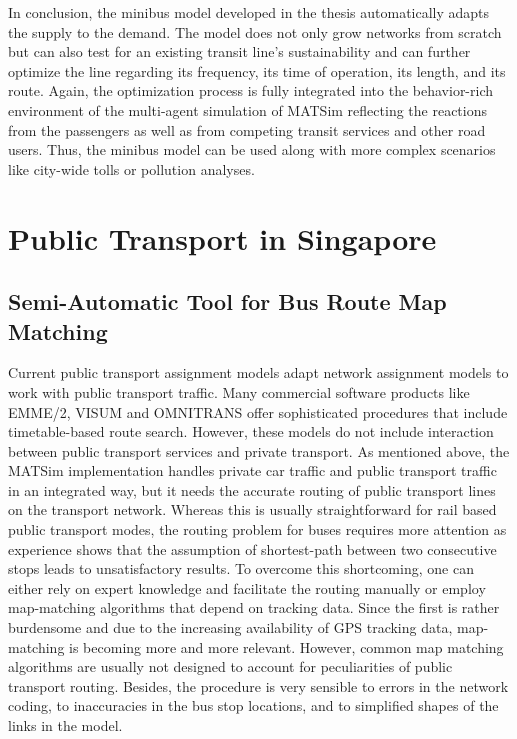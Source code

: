 In conclusion, the minibus model developed in the thesis automatically adapts the supply to the demand. The model does not only grow networks from scratch but can also test for an existing transit line's sustainability and can further optimize the line regarding its frequency, its time of operation, its length, and its route. Again, the optimization process is fully integrated into the behavior-rich environment of the multi-agent simulation of MATSim reflecting the reactions from the passengers as well as from competing transit services and other road users. Thus, the minibus model can be used along with more complex scenarios like city-wide tolls or pollution analyses.

\section{Public Transport in Singapore}
\subsection{Semi-Automatic Tool for Bus Route Map Matching}
\label{sec:SemiTool}
Current public transport assignment models adapt network assignment models to work with public transport traffic. Many commercial software products like EMME/2, VISUM and OMNITRANS offer sophisticated procedures that include timetable-based route search. However, these models do not include interaction between public transport services and private transport. As mentioned above, the MATSim implementation handles private car traffic and public transport traffic in an integrated way, but it needs the accurate routing of public transport lines on the transport network. Whereas this is usually straightforward for rail based public transport modes, the routing problem for buses requires more attention as experience shows that the assumption of shortest-path between two consecutive stops leads to unsatisfactory results. To overcome this shortcoming, one can either rely on expert knowledge and facilitate the routing manually or employ map-matching algorithms that depend on tracking data. Since the first is rather burdensome and due to the increasing availability of GPS tracking data, map-matching is becoming more and more relevant. However, common map matching algorithms are usually not designed to account for peculiarities of public transport routing. Besides, the procedure is very sensible to errors in the network coding, to inaccuracies in the bus stop locations, and to simplified shapes of the links in the model.

